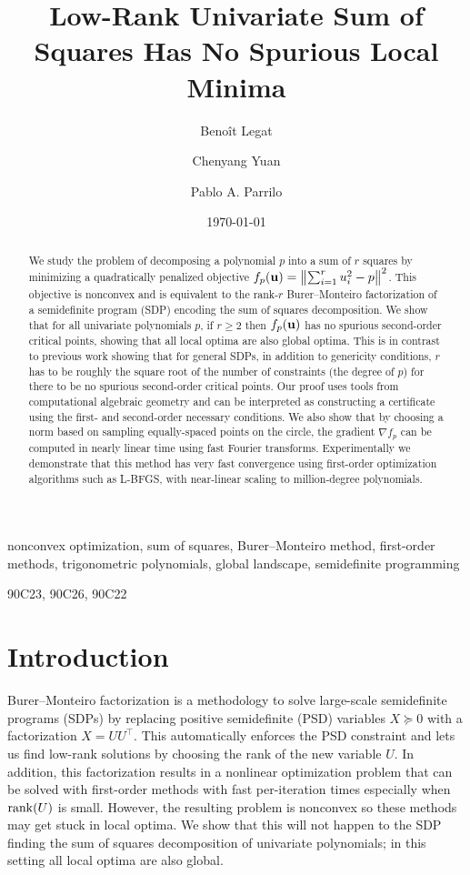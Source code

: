 \documentclass[final,onefignum,onetabnum]{siamart220329}
\title{Low-Rank Univariate Sum of Squares Has No Spurious Local Minima}
\author{Beno\^it Legat \and Chenyang Yuan \and Pablo A. Parrilo}
\date{\today}
\begin{document}
\maketitle

\begin{abstract}
  We study the problem of decomposing a polynomial $p$ into a sum of $r$ squares
  by minimizing a quadratically penalized objective
  $f_p(\boldsymbol{\mathbf{u}}) = \left\lVert \sum_{i=1}^r u_i^2 - p \right\lVert^2$. This objective is nonconvex
  and is equivalent to the rank-$r$ Burer--Monteiro factorization of a
  semidefinite program (SDP) encoding the sum of squares decomposition. We show
  that for all univariate polynomials $p$, if $r \ge 2$ then $f_p(\boldsymbol{\mathbf{u}})$ has
  no spurious second-order critical points, showing that all local optima are
  also global optima. This is in contrast to previous work showing that for
  general SDPs, in addition to genericity conditions, $r$ has to be roughly the
  square root of the number of constraints (the degree of $p$) for there to be
  no spurious second-order critical points. Our proof uses tools from
  computational algebraic geometry and can be interpreted as constructing a
  certificate using the first- and second-order necessary conditions. We also
  show that by choosing a norm based on sampling equally-spaced points on the
  circle, the gradient $\nabla f_p$ can be computed in nearly linear time using
  fast Fourier transforms. Experimentally we demonstrate that this method has
  very fast convergence using first-order optimization algorithms such as
  \mbox{L-BFGS}, with near-linear scaling to million-degree polynomials.
\end{abstract}

\begin{keywords}
nonconvex optimization, sum of squares, Burer--Monteiro method, first-order methods, trigonometric polynomials, global landscape, semidefinite programming
\end{keywords}

\begin{MSCcodes}
90C23, 90C26, 90C22
\end{MSCcodes}

\section{Introduction}
Burer--Monteiro factorization \cite{Burernonlinearprogrammingalgorithm2003} is a
methodology to solve large-scale semidefinite programs (SDPs) by replacing
positive semidefinite (PSD) variables $X \succeq 0$ with a factorization
$X = UU^\top$. This automatically enforces the PSD constraint and lets us find
low-rank solutions by choosing the rank of the new variable $U$. In addition,
this factorization results in a nonlinear optimization problem that can be
solved with first-order methods with fast per-iteration times especially when
$\operatorname{rank}(U)$ is small. However, the resulting problem is nonconvex so these
methods may get stuck in local optima. We show that this will not happen to the
SDP finding the sum of squares decomposition of univariate polynomials; in this
setting all local optima are also global.
\end{document}
